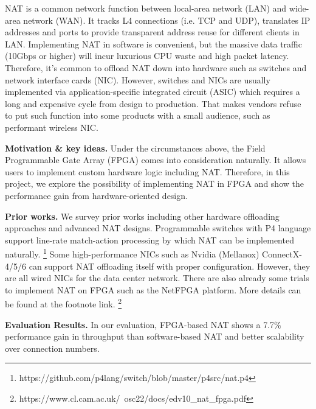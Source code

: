 





NAT is a common network function between local-area network (LAN) and wide-area
network (WAN). 
It tracks L4 connections (i.e. TCP and UDP), translates IP addresses and ports to 
provide transparent address reuse for different clients in LAN.
Implementing NAT in software is convenient, but the massive data traffic (10Gbps or higher) will incur luxurious CPU waste and high packet latency. Therefore, it's common to offload NAT down into hardware such as switches and network interface cards (NIC). 
However, switches and NICs are usually implemented via application-specific integrated circuit (ASIC) which requires a long and expensive cycle from design to production. That makes vendors refuse to put such function into some products with a small audience, such as performant wireless NIC. 



\textbf{Motivation \& key ideas.} 
Under the circumstances above, the Field Programmable Gate Array (FPGA) comes into consideration naturally. 
It allows users to implement custom hardware logic including NAT. Therefore, in this project, we explore the possibility of implementing NAT in FPGA and show the performance gain from hardware-oriented design. 

\textbf{Prior works.} We survey prior works including other hardware offloading approaches and advanced NAT designs. Programmable switches with P4 language support line-rate match-action processing by which NAT can be implemented naturally. 
\footnote{https://github.com/p4lang/switch/blob/master/p4src/nat.p4}
Some high-performance NICs such as Nvidia (Mellanox) ConnectX-4/5/6 can support NAT offloading itself with proper configuration. However, they are all wired NICs for the data center network.
There are also already some trials to implement NAT on FPGA such as the NetFPGA platform. More details can be found at the footnote link.
\footnote{https://www.cl.cam.ac.uk/~osc22/docs/edv10\_nat\_fpga.pdf}

\textbf{Evaluation Results.} In our evaluation, FPGA-based NAT shows a 7.7\% performance gain in throughput than software-based NAT and better scalability over connection numbers.


